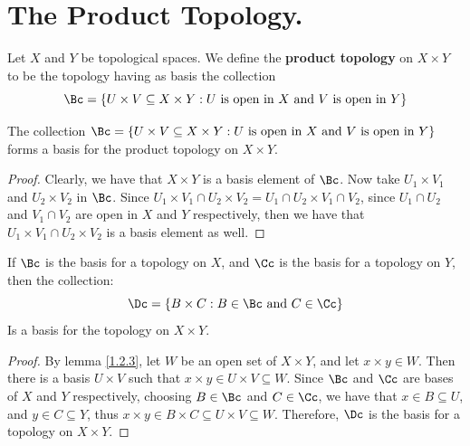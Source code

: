 
\section{The Product Topology.}

\begin{definition}
    Let $X$ and $Y$ be topological spaces. We define the \textbf{product topology} on
    $X \times Y$ to be the topology having as basis the collection
    \begin{equation*}
\Bc=\{U \times V \subseteq X \times Y:
    U \text{ is open in } X \text{ and } V \text{ is open in } Y\}
    \end{equation*}
\end{definition}

\begin{theorem}\label{1.4.1}
    The collection $\Bc=\{U \times V \subseteq X \times Y: U \text{ is open in }
        X \text{ and } V \text{ is open in } Y\}$ forms a basis for the product
        topology on $X \times Y$.
\end{theorem}
\begin{proof}
    Clearly, we have that $X \times Y$ is a basis element of  $\Bc$. Now take
    $U_1 \times V_1$ and $U_2 \times V_2$ in $\Bc$. Since  $U_1 \times V_1
    \cap U_2 \times V_2=U_1 \cap U_2 \times V_1 \cap V_2$, since $U_1 \cap U_2$
    and $V_1 \cap V_2$ are open in $X$ and  $Y$ respectively, then we have that
    $U_1 \times V_1 \cap U_2 \times V_2$ is a basis element as well.
\end{proof}

\begin{theorem}\label{1.4.2}
    If $\Bc$ is the basis for a topology on  $X$, and  $\Cc$ is the basis for a
    topology on  $Y$, then the collection:
        \begin{equation*}
            \Dc=\{B \times C: B \in \Bc \text{ and } C \in \Cc\}
        \end{equation*}
    Is a basis for the topology on $X \times Y$.
\end{theorem}
\begin{proof}
    By lemma \ref{1.2.3}, let $W$ be an open set of  $X \times Y$, and let
    $x \times y \in W$. Then there is a basis  $U \times V$ such that
    $x \times y \in U \times V \subseteq W$. Since  $\Bc$ and  $\Cc$ are bases
    of  $X$ and  $Y$ respectively, choosing  $B \in \Bc$ and  $C \in \Cc$, we
    have that  $x \in B \subseteq U$, and  $y \in C \subseteq Y$, thus
    $x \times y \in B \times C \subseteq U \times V \subseteq W$. Therefore,
    $\Dc$ is the basis for a topology on  $X \times Y$.
\end{proof}

